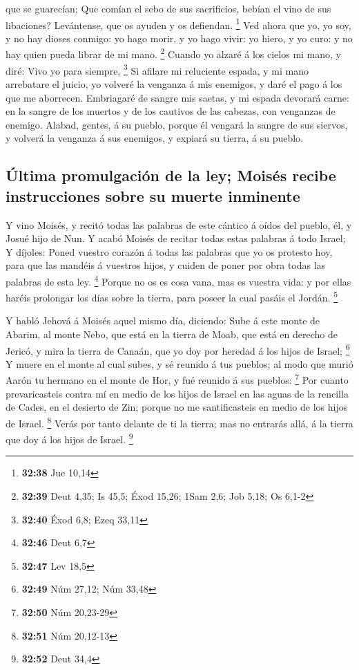 que se guarecían;  Que comían el sebo de sus sacrificios,
bebían el vino de sus libaciones? Levántense, que os ayuden y os
defiendan. \footnote{\textbf{32:38} Jue 10,14}  Ved ahora
que yo, yo soy, y no hay dioses conmigo: yo hago morir, y yo hago vivir:
yo hiero, y yo curo: y no hay quien pueda librar de mi mano. \footnote{\textbf{32:39}
  Deut 4,35; Is 45,5; Éxod 15,26; 1Sam 2,6; Job 5,18; Os 6,1-2}
 Cuando yo alzaré á los cielos mi mano, y diré: Vivo yo
para siempre, \footnote{\textbf{32:40} Éxod 6,8; Ezeq 33,11}
 Si afilare mi reluciente espada, y mi mano arrebatare el
juicio, yo volveré la venganza á mis enemigos, y daré el pago á los que
me aborrecen.  Embriagaré de sangre mis saetas, y mi espada
devorará carne: en la sangre de los muertos y de los cautivos de las
cabezas, con venganzas de enemigo.  Alabad, gentes, á su
pueblo, porque él vengará la sangre de sus siervos, y volverá la
venganza á sus enemigos, y expiará su tierra, á su pueblo.

\hypertarget{uxfaltima-promulgaciuxf3n-de-la-ley-moisuxe9s-recibe-instrucciones-sobre-su-muerte-inminente}{%
\subsection{Última promulgación de la ley; Moisés recibe instrucciones
sobre su muerte
inminente}\label{uxfaltima-promulgaciuxf3n-de-la-ley-moisuxe9s-recibe-instrucciones-sobre-su-muerte-inminente}}

 Y vino Moisés, y recitó todas las palabras de este cántico
á oídos del pueblo, él, y Josué hijo de Nun.  Y acabó
Moisés de recitar todas estas palabras á todo Israel;  Y
díjoles: Poned vuestro corazón á todas las palabras que yo os protesto
hoy, para que las mandéis á vuestros hijos, y cuiden de poner por obra
todas las palabras de esta ley. \footnote{\textbf{32:46} Deut 6,7}
 Porque no os es cosa vana, mas es vuestra vida: y por
ellas haréis prolongar los días sobre la tierra, para poseer la cual
pasáis el Jordán. \footnote{\textbf{32:47} Lev 18,5}

 Y habló Jehová á Moisés aquel mismo día, diciendo:
 Sube á este monte de Abarim, al monte Nebo, que está en la
tierra de Moab, que está en derecho de Jericó, y mira la tierra de
Canaán, que yo doy por heredad á los hijos de Israel; \footnote{\textbf{32:49}
  Núm 27,12; Núm 33,48}  Y muere en el monte al cual subes,
y sé reunido á tus pueblos; al modo que murió Aarón tu hermano en el
monte de Hor, y fué reunido á sus pueblos: \footnote{\textbf{32:50} Núm
  20,23-29}  Por cuanto prevaricasteis contra mí en medio
de los hijos de Israel en las aguas de la rencilla de Cades, en el
desierto de Zin; porque no me santificasteis en medio de los hijos de
Israel. \footnote{\textbf{32:51} Núm 20,12-13}  Verás por
tanto delante de ti la tierra; mas no entrarás allá, á la tierra que doy
á los hijos de Israel. \footnote{\textbf{32:52} Deut 34,4}


